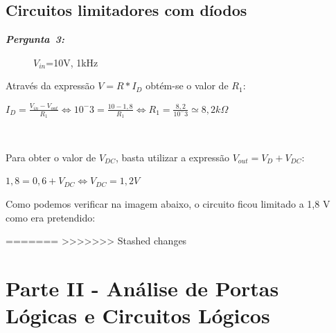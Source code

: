 \documentclass[pdftex,12pt,a4paper]{report}
\begin{document}
\subsection{Circuitos limitadores com díodos}
\hbox{\emph{\textbf{Pergunta 3:}\newline}}

\begin{figure}[h]
\centerline{}
\caption{$V_{in}$=10V, 1kHz}\label{circuito13}
\end{figure}
Através da expressão $V = R*I_D$ obtém-se o valor de $R_1$:\newline
\centerline{$I_D = \frac{V_{in} - V_{out}}{R_1} \Leftrightarrow 10^-3 = \frac{10-1,8}{R_1} \Leftrightarrow R_1 = \frac{8,2}{10^-3} \simeq 8,2k\Omega$}\\
\vspace{0.1cm}

Para obter o valor de $V_{DC}$, basta utilizar a expressão $V_{out} = V_D + V_{DC}$:
\centerline{$ 1,8 = 0,6 + V_{DC} \Leftrightarrow V_{DC} = 1,2V$}

Como podemos verificar na imagem abaixo, o circuito ficou limitado a 1,8 V como era pretendido:

\begin{figure}[h]
\centerline{}
\caption{ }\label{grafico_1c_osciloscopio}
\end{figure}

\newpage

=======
>>>>>>> Stashed changes
\section{Parte II - Análise	de	Portas	Lógicas	e	Circuitos	Lógicos}
\end{document}
